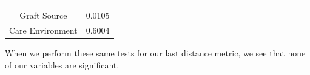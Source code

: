 \documentclass[12pt,twoside]{dukestatscithesis}
\begin{document}
\begin{longtable}[]{@{}cc@{}}
\begin{minipage}[t]{0.30\columnwidth}
\end{minipage}\tabularnewline
\begin{minipage}[t]{0.54\columnwidth}\centering\strut
Graft Source\strut
\end{minipage} & \begin{minipage}[t]{0.30\columnwidth}\centering\strut
0.0105\strut
\end{minipage}\tabularnewline
\begin{minipage}[t]{0.54\columnwidth}\centering\strut
Care Environment\strut
\end{minipage} & \begin{minipage}[t]{0.30\columnwidth}\centering\strut
0.6004\strut
\end{minipage}\tabularnewline
\bottomrule
\end{longtable}
When we perform these same tests for our last distance metric, we see
that none of our variables are significant.
\end{document}
